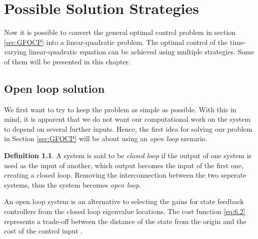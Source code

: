 \documentclass[paper=a4, pagesize, DIV=calc, BCOR=12.5mm, twoside=on, onecolumn=on, open = any, titlepage =on, parskip =half-, headsepline = on, footsepline = on, chapterprefix = on, appendixprefix = off, fontsize = 12pt, numbers = noenddot, abstract = on]{scrbook}
\numberwithin{equation}{chapter}
\theoremstyle{definition}
\newtheorem{definition}{Definition}
\theoremstyle{plain}
\theoremstyle{plain}
\theoremstyle{remark}
\theoremstyle{plain}
\theoremstyle{plain}
\begin{document}
\par \singlespacing
\chapter{Possible Solution Strategies}
\onehalfspacing
Now it is possible to convert the general optimal control problem in section \ref{sec:GFOCP} into a linear-quadratic problem. The optimal control of the time-varying linear-quadratic equation can be achieved using multiple strategies. Some of them will be presented in this chapter.

\par \singlespacing
\section{Open loop solution}
\onehalfspacing
We first want to try to keep the problem as simple as possible. With this in mind, it is apparent that we do not want our computational work on the system to depend on several further inputs. Hence, the first idea for solving our problem in Section \ref{sec:GFOCP} will be about using an \emph{open loop} szenario.
\begin{definition} \cite[1.1]{astrom:2009} \newline
A system is said to be \emph{closed loop} if the output of one system is used as the input of another, which output becomes the input of the first one, creating a closed loop. Removing the interconnection between the two seperate systems, thus the system becomes \emph{open loop}.
\end{definition}
An open loop system is an alternative to selecting the gains for state feedback controllers from the closed loop eigenvalue locations. The cost function \eqref{eq:6.2} represents a trade-off between the distance of the state from the origin and the cost of the control input \cite[p.202]{astrom:2009}.
\end{document}
